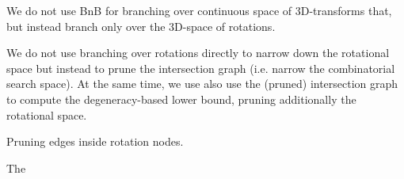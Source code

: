 We do not use BnB for branching over continuous space of 3D-transforms that, but instead branch only over the 3D-space of rotations. 

We do not use branching over rotations directly to narrow down the rotational space but instead to prune the intersection graph (i.e. narrow the combinatorial search space). 
At the same time, we use also use the (pruned) intersection graph to compute the degeneracy-based lower bound, pruning additionally the rotational space.

Pruning edges inside rotation nodes.

The 



